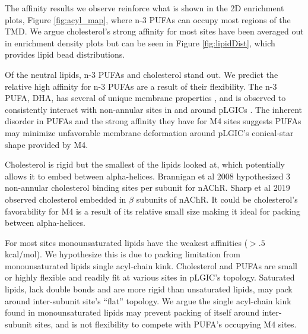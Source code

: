 \documentclass[preprint,3p,9pt,times,onecolumn]{elsarticle}
\newcommand{\nachr}{nAChR}
\newcommand{\plgic}{pLGIC}
\begin{document}
The affinity results we observe reinforce what is shown in the 2D enrichment plots, Figure \ref{fig:acyl_map}, where n-3 PUFAs can occupy most regions of the TMD. We argue cholesterol's strong affinity for most sites have been averaged out in enrichment density plots but can be seen in Figure \ref{fig:lipidDist}, which provides lipid bead distributions.

Of the neutral lipids, n-3 PUFAs and cholesterol stand out. We predict the relative high affinity for n-3 PUFAs are a result of their flexibility. The n-3 PUFA, DHA, has several of unique membrane properties \cite{Stillwell2003a,Gawrisch2003}, and is observed to consistently interact with non-annular sites in and around \plgic s \cite{Sharp2019, Woods2019}. The inherent disorder in PUFAs and the strong affinity they have for M4 sites suggests PUFAs may minimize unfavorable membrane deformation\cite{Brannigan2006,Brannigan2007,Hu2012a,Argudo2016a,BuganzaTepole2017,Dan1993,Fournier2015} around \plgic's conical-star shape provided by M4. 

Cholesterol is rigid but the smallest of the lipids looked at, which potentially allows it to embed between alpha-helices. Brannigan et al 2008 \cite{Brannigan2008} hypothesized 3 non-annular cholesterol binding sites per subunit for \nachr. Sharp et al 2019 \cite{Sharp2019} observed cholesterol embedded in $\beta$ subunits of \nachr. It could be cholesterol's favorability for M4 is a result of its relative small size making it ideal for packing between alpha-helices.

For most sites monounsaturated lipids have the weakest affinities ($>.5$ kcal/mol). We hypothesize this is due to packing limitation from monounsaturated lipids single acyl-chain kink. Cholesterol and PUFAs are small or highly flexible and readily fit at various sites in \plgic's topology. Saturated lipids, lack double bonds and are more rigid than unsaturated lipids, may pack around inter-subunit site's ``flat'' topology. We argue the single acyl-chain kink found in monounsaturated lipids may prevent packing of itself around inter-subunit sites, and is not flexibility to compete with PUFA's occupying M4 sites. 
\end{document}

